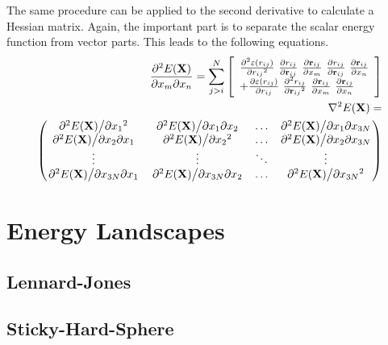 The same procedure can be applied to the second derivative to calculate a
Hessian matrix. Again, the important part is to separate the scalar energy
function from vector parts. This leads to the following equations.
%
\begin{align}
    \pdv{E(\mathbf{X})}{x_m}{x_n}=\sum_{j>i}^N\left[  
    \begin{array}{ll}
    \pdv[2]{\varepsilon(r_{ij})}{{r_{ij}}}\  
    \pdv{r_{ij}}{\mathbf{r}_{ij}}\ 
    \pdv{\mathbf{r}_{ij}}{x_m}\ 
    \pdv{r_{ij}}{\mathbf{r}_{ij}}\ 
    \pdv{\mathbf{r}_{ij}}{x_n} \\ 
    +
    \pdv{\varepsilon(r_{ij})}{r_{ij}}\
        \pdv[2]{r_{ij}}{{\mathbf{r}_{ij}}}\ 
    \pdv{\mathbf{r}_{ij}}{x_m}\ 
    \pdv{\mathbf{r}_{ij}}{x_n} 
    \end{array}
    \right]\\
    \begin{aligned}
    \nabla^2 E(\mathbf{X})=\\
    \begin{pmatrix}
        \pdv*[2]{E(\mathbf{X})}{{x_1}} & \pdv*{E(\mathbf{X})}{x_1}{x_2} & \ldots & \pdv*{E(\mathbf{X})}{x_1}{x_{3N}}\\
        \pdv*{E(\mathbf{X})}{x_2}{x_1} & \pdv*[2]{E(\mathbf{X})}{{x_2}} & \ldots & \pdv*{E(\mathbf{X})}{x_2}{x_{3N}}\\
        \vdots & \vdots & \ddots & \vdots\\
        \pdv*{E(\mathbf{X})}{x_{3N}}{x_1} & \pdv*{E(\mathbf{X})}{x_{3N}}{x_2} & \ldots & \pdv*[2]{E(\mathbf{X})}{{x_{3N}}}
    \end{pmatrix}
    \end{aligned}
\end{align}



\chapter{Energy Landscapes}
\label{sec:energylandscapes}

\section{Lennard-Jones}
\label{sec:LennardJones}

\section{Sticky-Hard-Sphere}
\label{sec:SHS}
